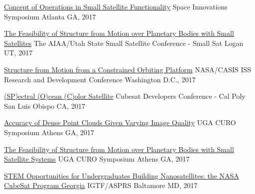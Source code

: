 \documentclass[10pt,a4paper]{article}
\begin{document}
\headedsection
  {{\color{bluegreen} \faMapO} \href{http://smallsat.uga.edu/images/documents/posters/Symposium_for_Space_Innovations_Poster.pdf}{Concept of Operations in Small Satellite Functionality}}{%
  \headedsubsection
    {Space Innovations Symposium}
    {Atlanta GA, 2017}
    {}
}

\headedsection
  {{\color{bluegreen} \faTelevision} \href{http://smallsat.uga.edu/images/documents/presentations/Feasability_of_Structure_from_motion_over_planetary_bodies_using_small_satellites.pdf}{The Feasibility of Structure from Motion over Planetary Bodies with Small Satellites}}{%
  \headedsubsection
    {The AIAA/Utah State Small Satellite Conference - Small Sat}
    {Logan UT, 2017}
    {}
}

\headedsection
  {{\color{bluegreen} \faMapO} \href{http://smallsat.uga.edu/images/documents/posters/Structure_from_Motion_from_a_Constrained_Orbit.pdf}{Structure from Motion from a Constrained Orbiting Platform}}{%
  \headedsubsection
    {NASA/CASIS ISS Research and Development Conference}
    {Washington D.C., 2017}
    {}
}

\headedsection
  {{\color{bluegreen} \faTelevision} \href{http://smallsat.uga.edu/images/documents/presentations/UGAWorkshop2017CubeSatDeveloper.pdf}{(SP)ectral (O)cean (C)olor Satellite}}{%
  \headedsubsection
    {Cubesat Developers Conference - Cal Poly}
    {San Luis Obispo CA, 2017}
    {}
}

\headedsection
  {{\color{bluegreen} \faMapO} \href{http://smallsat.uga.edu/images/documents/posters/nirav_curo_poster.pdf}{Accuracy of Dense Point Clouds Given Varying Image Quality}}{%
  \headedsubsection
    {UGA CURO Symposium}
    {Athens GA, 2017}
    {}
}

\headedsection
  {{\color{bluegreen} \faTelevision} \href{http://smallsat.uga.edu/images/documents/presentations/Space_SFM-2017_CURO_Syposium.pdf}{The Feasibility of Structure from Motion over Planetary Bodies with Small Satellite Systems}}{%
  \headedsubsection
    {UGA CURO Symposium}
    {Athens GA, 2017}
    {}
}

\headedsection
  {{\color{bluegreen} \faTelevision} \href{http://smallsat.uga.edu/images/documents/posters/2017-ASPRS-IGTF-1-STEMopprotunities.pdf}{STEM Opportunities for Undergraduates Building Nanosatellites: the NASA CubeSat Program Georgia}}{%
  \headedsubsection
    {IGTF/ASPRS}
    {Baltamore MD, 2017}
    {}
}
\end{document}
